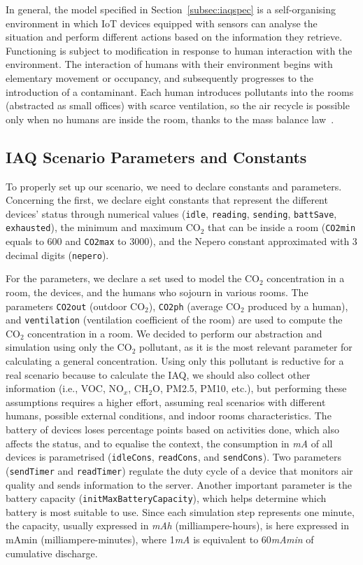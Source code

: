 \documentclass[runningheads]{llncs}
\begin{document}
In general, the model specified in Section~\ref{subsec:iaqspec} is a self-organising environment in which IoT devices equipped with sensors can analyse the situation and perform different actions based on the information they retrieve. 
%
Functioning is subject to modification in response to human interaction with the environment. 
%
The interaction of humans with their environment begins with elementary movement or occupancy, and subsequently progresses to the introduction of a contaminant. Each human introduces pollutants into the rooms (abstracted as small offices) with scarce ventilation, so the air recycle is possible only when no humans are inside the room, thanks to the mass balance law~\cite{HERNANDEZCRUZ2026114099}.
    
\subsection{IAQ Scenario Parameters and Constants}\label{subsec:iaqparam}

To properly set up our scenario, we need to declare constants and parameters.
Concerning the first, we declare eight constants that represent the different devices' status through numerical values (\lstinline{idle}, \lstinline{reading}, \lstinline{sending}, \lstinline{battSave}, \lstinline{exhausted}), the minimum and maximum CO$_2$ that can be inside a room (\lstinline{CO2min} equals to 600 and  \lstinline{CO2max} to 3000), and the Nepero constant approximated with 3 decimal digits (\lstinline{nepero}).

For the parameters, we declare a set used to model the CO$_2$ concentration in a room, the devices, and the humans who sojourn in various rooms. The parameters \lstinline{CO2out} (outdoor CO$_2$), \lstinline{CO2ph} (average CO$_2$ produced by a human), and \lstinline{ventilation} (ventilation coefficient of the room) are used to compute the CO$_2$ concentration in a room.
%
We decided to perform our abstraction and simulation using only the CO$_2$ pollutant, as it is the most relevant parameter for calculating a general concentration. Using only this pollutant is reductive for a real scenario because to calculate the IAQ, we should also collect other information (i.e., VOC, NO$_x$, CH$_2$O, PM2.5, PM10, etc.), but performing these assumptions requires a higher effort, assuming real scenarios with different humans, possible external conditions, and indoor rooms characteristics.
%
The battery of devices loses percentage points based on activities done, which also affects the status, and to equalise the context, the consumption in \emph{mA} of all devices is parametrised (\lstinline{idleCons}, \lstinline{readCons}, and \lstinline{sendCons}). 
%
Two parameters (\lstinline{sendTimer} and \lstinline{readTimer}) regulate the duty cycle of a device that monitors air quality and sends information to the server. 
%
Another important parameter is the battery capacity (\lstinline{initMaxBatteryCapacity}), which helps determine which battery is most suitable to use. 
Since each simulation step represents one minute, the capacity, usually expressed in \emph{mAh} (milliampere-hours), is here expressed in mAmin (milliampere-minutes), where 1\emph{mA} is equivalent to 60\emph{mAmin} of cumulative discharge.
\end{document}
